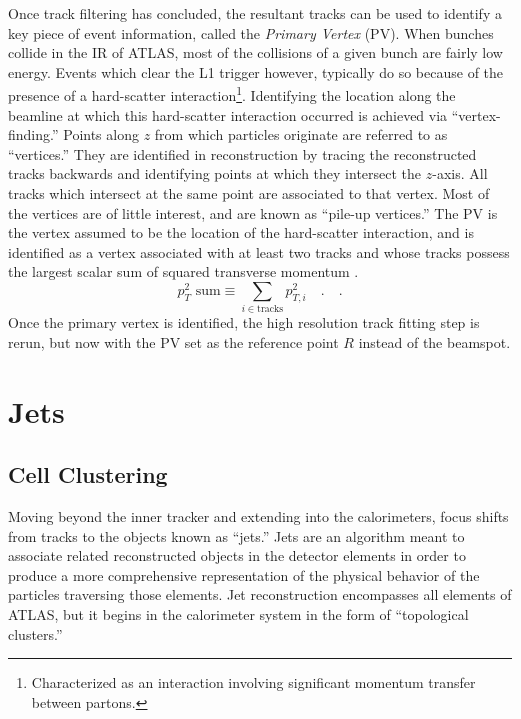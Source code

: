             Once track filtering has concluded,
                the resultant tracks can be used to identify a key piece of event information, 
                called the \textit{Primary Vertex} (PV).
            When bunches collide in the IR of ATLAS, most of the collisions of a given bunch are fairly low energy.
            Events which clear the L1 trigger however, typically do so because of the presence of a hard-scatter interaction\footnote{
                Characterized as an interaction involving significant momentum transfer between partons.}.
            Identifying the location along the beamline at which this hard-scatter interaction occurred is achieved via ``vertex-finding.''
            Points along $z$ from which particles originate are referred to as ``vertices.''
            They are identified in reconstruction by tracing the reconstructed tracks backwards
                and identifying points at which they intersect the $z$-axis.
            All tracks which intersect at the same point are associated to that vertex.
            Most of the vertices are of little interest, and are known as ``pile-up vertices.''
            The PV is the vertex assumed to be the location of the hard-scatter interaction,
                and is identified as a vertex associated with at least two tracks
                and whose tracks possess the largest scalar sum of squared transverse momentum
                    \cite{jet_energy_scale13TeV} \cite{primary_vertex_identification}.
                \begin{equation}
                    p_T^2 \textrm{ sum}  \equiv \sum\limits_{i \in \textrm{tracks}} p_{T,i}^2 \quad.
                    \quad.
                \end{equation}
            Once the primary vertex is identified, the high resolution track fitting step is rerun,
                but now with the PV set as the reference point $R$ instead of the beamspot.


    \FloatBarrier
    \section{Jets}

        \subsection{Cell Clustering}

        Moving beyond the inner tracker and extending into the calorimeters,
            focus shifts from tracks to the objects known as ``jets.''
        Jets are an algorithm meant to associate related reconstructed objects in the detector elements
            in order to produce a more comprehensive representation of the physical behavior of the particles traversing those elements.
        Jet reconstruction encompasses all elements of ATLAS,
            but it begins in the calorimeter system in the form of ``topological clusters.''

